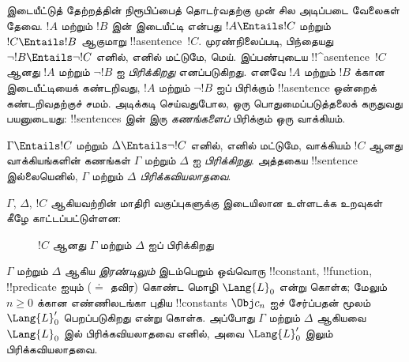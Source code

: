 \documentclass[../../../include/open-logic-section]{subfiles}
\begin{document}



இடையீட்டுத் தேற்றத்தின் நிரூபிப்பைத் தொடர்வதற்கு முன் சில அடிப்படை
வேலைகள் தேவை. $!A$ மற்றும் $!B$ இன் இடையீட்டி என்பது
$!A \Entails !C$ மற்றும் $!C \Entails !B$ ஆகுமாறு !!a{sentence}~$!C$.
முரண்நிலைப்படி, பிந்தையது $\lnot !B \Entails \lnot
!C$ எனில், எனில் மட்டுமே, மெய். இப்பண்புடைய !!^a{sentence}~$!C$
ஆனது $!A$ மற்றும் $\lnot !B$ ஐ \emph{பிரிக்கிறது} எனப்படுகிறது.
எனவே $!A$ மற்றும் $!B$ க்கான இடையீட்டியைக் கண்டறிவது, $!A$ மற்றும்
$\lnot !B$ ஐப் பிரிக்கும் !!a{sentence} ஒன்றைக் கண்டறிவதற்குச் சமம்.
அடிக்கடி செய்வதுபோல, ஒரு பொதுமைப்படுத்தலைக் கருதுவது பயனுடையது:
!!{sentence}s இன் இரு \emph{கணங்களைப்} பிரிக்கும் ஒரு வாக்கியம்.

\begin{defn}
$\Gamma \Entails !C$ மற்றும் $\Delta \Entails
\lnot !C$ எனில், எனில் மட்டுமே, வாக்கியம் $!C$ ஆனது வாக்கியங்களின்
கணங்கள் $\Gamma$ மற்றும் $\Delta$ ஐ \emph{பிரிக்கிறது}. அத்தகைய
!!{sentence} இல்லையெனில், $\Gamma$ மற்றும் $\Delta$
\emph{பிரிக்கவியலாதவை}.
\end{defn}

$\Gamma$, $\Delta$, $!C$ ஆகியவற்றின் மாதிரி வகுப்புகளுக்கு இடையிலான
உள்ளடக்க உறவுகள் கீழே காட்டப்பட்டுள்ளன:
\begin{figure}[h]
  \centering
  \caption{$!C$ ஆனது $\Gamma$ மற்றும் $\Delta$ ஐப் பிரிக்கிறது}
\end{figure}


\begin{lem}
$\Gamma$ மற்றும் $\Delta$ ஆகிய \emph{இரண்டிலும்} இடம்பெறும் ஒவ்வொரு
!!{constant}, !!{function}, !!{predicate} ஐயும் ($\doteq$ தவிர)
கொண்ட மொழி $\Lang{L}_0$ என்று கொள்க; மேலும் $n
\ge 0$ க்கான எண்ணிலடங்கா புதிய !!{constant}s $\Obj c_n$ ஐச்
சேர்ப்பதன் மூலம் $\Lang{L}'_0$ பெறப்படுகிறது என்று கொள்க. அப்போது
$\Gamma$ மற்றும் $\Delta$ ஆகியவை $\Lang{L}_0$ இல் பிரிக்கவியலாதவை
எனில், அவை $\Lang{L}'_0$ இலும் பிரிக்கவியலாதவை.
\end{lem}
\end{document}
